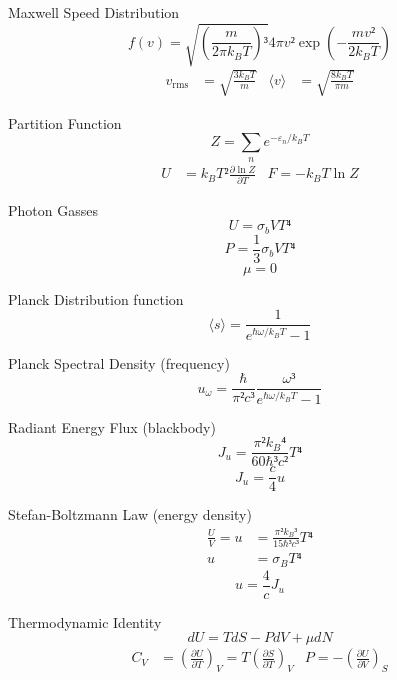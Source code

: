 \documentclass[avery5371]{flashcards}
\begin{document}
\begin{flashcard}{Maxwell Speed Distribution}
	\[ f(v) = \sqrt{ (\frac{m}{2π k_B T})³ } 4πv² \exp(-\frac{mv²}{2k_B T}) \]
	\begin{align*}
		v_\mathrm{rms} &= \sqrt{\frac{3k_B T}{m}}
			& ⟨v⟩ &= \sqrt{\frac{8k_B T}{πm}}
	\end{align*}
\end{flashcard}

\begin{flashcard}{Partition Function}
	\[ Z = \sum_n e^{-ε_n / k_B T} \]
	\begin{align*}
		U &= k_B T² \frac{∂ \ln Z}{∂T}
			& F = -k_B T \ln Z
	\end{align*}
\end{flashcard}

\begin{flashcard}{Photon Gasses}
	\[ U = σ_b VT⁴ \]
	\[ P = \frac 13 σ_b VT⁴ \]
	\[ μ = 0 \]
\end{flashcard}

\begin{flashcard}{Planck Distribution function}
	\[ ⟨s⟩ = \frac{1}{e^{ℏω/k_B T} - 1} \]
\end{flashcard}

\begin{flashcard}{Planck Spectral Density (frequency)}
	\[ u_ω = \frac{ℏ}{π²c³} \frac{ω³}{e^{ℏω/k_B T} - 1} \]
\end{flashcard}

\begin{flashcard}{Radiant Energy Flux (blackbody)}
	\[ J_u = \frac{π²{k_B}⁴}{60ℏ³c²} T⁴ \]
	\[ J_u = \frac{c}{4} u \]
\end{flashcard}

\begin{flashcard}{Stefan-Boltzmann Law (energy density)}
	\begin{align*}
		\frac{U}{V} = u &= \frac{π²{k_B}³}{15ℏ³c³} T⁴ \\
			u &= σ_B T⁴
	\end{align*}
	\[ u = \frac{4}{c} J_u \]
\end{flashcard}

\begin{flashcard}{Thermodynamic Identity}
	\[ dU = T dS - P dV + μ dN \]
	\begin{align*}
		C_V &= (\frac{∂U}{∂T})_V = T (\frac{∂S}{∂T})_V
			& P = -(\frac{∂U}{∂V})_S
	\end{align*}
\end{flashcard}
\end{document}
